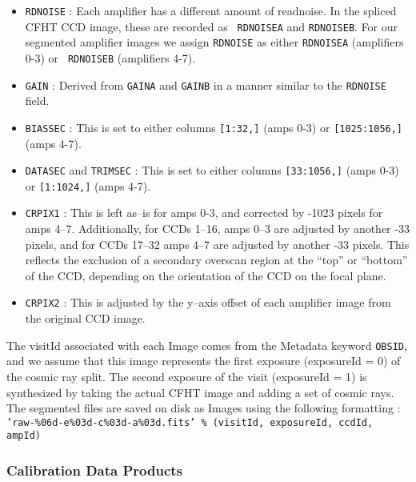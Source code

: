 \begin{itemize}

\item {\tt RDNOISE} : Each amplifier has a different amount of
readnoise.  In the spliced CFHT CCD image, these are recorded as {\tt
RDNOISEA} and {\tt RDNOISEB}.  For our segmented amplifier images we
assign {\tt RDNOISE} as either {\tt RDNOISEA} (amplifiers 0-3) or {\tt
RDNOISEB} (amplifiers 4-7).

\item {\tt GAIN} : Derived from {\tt GAINA} and {\tt GAINB} in a
manner similar to the {\tt RDNOISE} field.

\item {\tt BIASSEC} : This is set to either columns {\tt [1:32,]} (amps
0-3) or {\tt [1025:1056,]} (amps 4-7).

\item {\tt DATASEC} and {\tt TRIMSEC} : This is set to either columns
{\tt [33:1056,]} (amps 0-3) or {\tt [1:1024,]} (amps 4-7).

\item {\tt CRPIX1} : This is left as--is for amps 0-3, and corrected
by -1023 pixels for amps 4--7.  Additionally, for CCDs 1--16, amps
0--3 are adjusted by another -33 pixels, and for CCDs 17--32 amps 4--7
are adjusted by another -33 pixels.  This reflects the exclusion of a
secondary overscan region at the ``top'' or ``bottom'' of the CCD,
depending on the orientation of the CCD on the focal plane.

\item {\tt CRPIX2} : This is adjusted by the y--axis offset of each
amplifier image from the original CCD image.

\end{itemize}

The visitId associated with each Image comes from the Metadata keyword
{\tt OBSID}, and we assume that this image represents the first
exposure (exposureId = 0) of the cosmic ray split.  The second exposure of the visit (exposureId = 1) 
is synthesized by taking the actual
CFHT image and adding a set of cosmic rays.  The segmented
files are saved on disk as Images using the following formatting :
{\tt 'raw-\%06d-e\%03d-c\%03d-a\%03d.fits' \% (visitId, exposureId,
ccdId, ampId)}

\subsubsection{Calibration Data Products}

